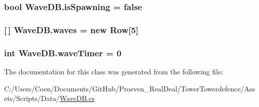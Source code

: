 \subsubsection[{\texorpdfstring{is\+Spawning}{isSpawning}}]{\setlength{\rightskip}{0pt plus 5cm}bool Wave\+D\+B.\+is\+Spawning = false}\hypertarget{class_wave_d_b_a58a898598de7b6fe4f7209d76c172ef4}{}\label{class_wave_d_b_a58a898598de7b6fe4f7209d76c172ef4}
\subsubsection[{\texorpdfstring{waves}{waves}}]{ \mbox{[}$\,$\mbox{]} Wave\+D\+B.\+waves = new {\bf Row}\mbox{[}5\mbox{]}}\hypertarget{class_wave_d_b_a9f4006a3f6ec66dfcc10a8fc0e01f702}{}\label{class_wave_d_b_a9f4006a3f6ec66dfcc10a8fc0e01f702}
\subsubsection[{\texorpdfstring{wave\+Timer}{waveTimer}}]{\setlength{\rightskip}{0pt plus 5cm}int Wave\+D\+B.\+wave\+Timer = 0}\hypertarget{class_wave_d_b_a76a00f39c5954e0c5e39ec3bd31011dd}{}\label{class_wave_d_b_a76a00f39c5954e0c5e39ec3bd31011dd}


The documentation for this class was generated from the following file\+:\begin{DoxyCompactItemize}
\item 
C\+:/\+Users/\+Coen/\+Documents/\+Git\+Hub/\+Proeven\+\_\+\+Real\+Deal/\+Tower\+Towerdefence/\+Assets/\+Scripts/\+Data/\hyperlink{_wave_d_b_8cs}{Wave\+D\+B.\+cs}\end{DoxyCompactItemize}
